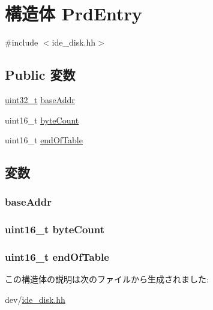 \hypertarget{structPrdEntry}{
\section{構造体 PrdEntry}
\label{structPrdEntry}
}


{\ttfamily \#include $<$ide\_\-disk.hh$>$}\subsection*{Public 変数}
\begin{DoxyCompactItemize}
\item 
\hyperlink{Type_8hh_a435d1572bf3f880d55459d9805097f62}{uint32\_\-t} \hyperlink{structPrdEntry_a7c740df4d4a57539f2c41a3b0f7438ec}{baseAddr}
\item 
uint16\_\-t \hyperlink{structPrdEntry_a45600d295fea880887d9d1a2061ec978}{byteCount}
\item 
uint16\_\-t \hyperlink{structPrdEntry_a997dafbf72dd5839b116645d399f50d6}{endOfTable}
\end{DoxyCompactItemize}


\subsection{変数}
\hypertarget{structPrdEntry_a7c740df4d4a57539f2c41a3b0f7438ec}{
\subsubsection[{baseAddr}]{ {\bf baseAddr}}}
\label{structPrdEntry_a7c740df4d4a57539f2c41a3b0f7438ec}
\hypertarget{structPrdEntry_a45600d295fea880887d9d1a2061ec978}{
\subsubsection[{byteCount}]{\setlength{\rightskip}{0pt plus 5cm}uint16\_\-t {\bf byteCount}}}
\label{structPrdEntry_a45600d295fea880887d9d1a2061ec978}
\hypertarget{structPrdEntry_a997dafbf72dd5839b116645d399f50d6}{
\subsubsection[{endOfTable}]{\setlength{\rightskip}{0pt plus 5cm}uint16\_\-t {\bf endOfTable}}}
\label{structPrdEntry_a997dafbf72dd5839b116645d399f50d6}


この構造体の説明は次のファイルから生成されました:\begin{DoxyCompactItemize}
\item 
dev/\hyperlink{ide__disk_8hh}{ide\_\-disk.hh}\end{DoxyCompactItemize}
